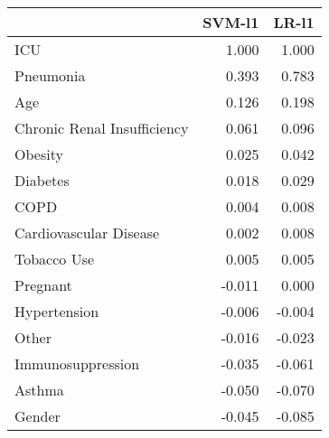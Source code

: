 \begin{tabular}{lrr}
\toprule
{} &  SVM-l1 &  LR-l1 \\
\midrule
ICU                         &   1.000 &  1.000 \\
Pneumonia                   &   0.393 &  0.783 \\
Age                         &   0.126 &  0.198 \\
Chronic Renal Insufficiency &   0.061 &  0.096 \\
Obesity                     &   0.025 &  0.042 \\
Diabetes                    &   0.018 &  0.029 \\
COPD                        &   0.004 &  0.008 \\
Cardiovascular Disease      &   0.002 &  0.008 \\
Tobacco Use                 &   0.005 &  0.005 \\
Pregnant                    &  -0.011 &  0.000 \\
Hypertension                &  -0.006 & -0.004 \\
Other                       &  -0.016 & -0.023 \\
Immunosuppression           &  -0.035 & -0.061 \\
Asthma                      &  -0.050 & -0.070 \\
Gender                      &  -0.045 & -0.085 \\
\bottomrule
\end{tabular}
